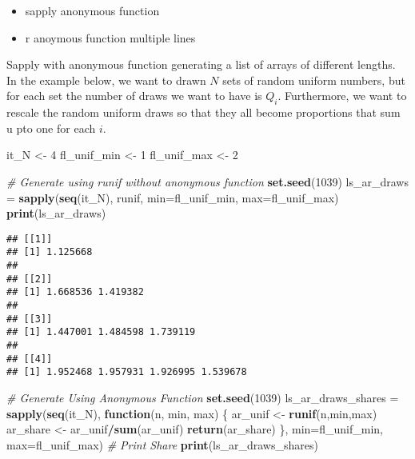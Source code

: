 \documentclass[
]{book}
\newenvironment{Shaded}{\begin{snugshade}}{\end{snugshade}}
\newcommand{\CommentTok}[1]{\textcolor[rgb]{0.56,0.35,0.01}{\textit{#1}}}
\newcommand{\ControlFlowTok}[1]{\textcolor[rgb]{0.13,0.29,0.53}{\textbf{#1}}}
\newcommand{\DataTypeTok}[1]{\textcolor[rgb]{0.13,0.29,0.53}{#1}}
\newcommand{\DecValTok}[1]{\textcolor[rgb]{0.00,0.00,0.81}{#1}}
\newcommand{\KeywordTok}[1]{\textcolor[rgb]{0.13,0.29,0.53}{\textbf{#1}}}
\newcommand{\NormalTok}[1]{#1}
\newcommand{\OperatorTok}[1]{\textcolor[rgb]{0.81,0.36,0.00}{\textbf{#1}}}
\newcommand{\StringTok}[1]{\textcolor[rgb]{0.31,0.60,0.02}{#1}}
\providecommand{\tightlist}{%
  \setlength{\itemsep}{0pt}\setlength{\parskip}{0pt}}
\begin{document}
\begin{itemize}
\tightlist
\item
  sapply anonymous function
\item
  r anoymous function multiple lines
\end{itemize}

Sapply with anonymous function generating a list of arrays of different lengths. In the example below, we want to drawn \(N\) sets of random uniform numbers, but for each set the number of draws we want to have is \(Q_i\). Furthermore, we want to rescale the random uniform draws so that they all become proportions that sum u pto one for each \(i\).

\begin{Shaded}
\begin{Highlighting}[]
\NormalTok{it_N <-}\StringTok{ }\DecValTok{4}
\NormalTok{fl_unif_min <-}\StringTok{ }\DecValTok{1}
\NormalTok{fl_unif_max <-}\StringTok{ }\DecValTok{2}

\CommentTok{# Generate using runif without anonymous function}
\KeywordTok{set.seed}\NormalTok{(}\DecValTok{1039}\NormalTok{)}
\NormalTok{ls_ar_draws =}\StringTok{ }\KeywordTok{sapply}\NormalTok{(}\KeywordTok{seq}\NormalTok{(it_N),}
\NormalTok{                     runif,}
                     \DataTypeTok{min=}\NormalTok{fl_unif_min, }\DataTypeTok{max=}\NormalTok{fl_unif_max)}
\KeywordTok{print}\NormalTok{(ls_ar_draws)}
\end{Highlighting}
\end{Shaded}

\begin{verbatim}
## [[1]]
## [1] 1.125668
## 
## [[2]]
## [1] 1.668536 1.419382
## 
## [[3]]
## [1] 1.447001 1.484598 1.739119
## 
## [[4]]
## [1] 1.952468 1.957931 1.926995 1.539678
\end{verbatim}

\begin{Shaded}
\begin{Highlighting}[]
\CommentTok{# Generate Using Anonymous Function}
\KeywordTok{set.seed}\NormalTok{(}\DecValTok{1039}\NormalTok{)}
\NormalTok{ls_ar_draws_shares =}\StringTok{ }\KeywordTok{sapply}\NormalTok{(}\KeywordTok{seq}\NormalTok{(it_N),}
                            \ControlFlowTok{function}\NormalTok{(n, min, max) \{}
\NormalTok{                             ar_unif <-}\StringTok{ }\KeywordTok{runif}\NormalTok{(n,min,max)}
\NormalTok{                             ar_share <-}\StringTok{ }\NormalTok{ar_unif}\OperatorTok{/}\KeywordTok{sum}\NormalTok{(ar_unif)}
                             \KeywordTok{return}\NormalTok{(ar_share)}
\NormalTok{                            \},}
                            \DataTypeTok{min=}\NormalTok{fl_unif_min, }\DataTypeTok{max=}\NormalTok{fl_unif_max)}
\CommentTok{# Print Share}
\KeywordTok{print}\NormalTok{(ls_ar_draws_shares)}
\end{Highlighting}
\end{Shaded}
\end{document}
